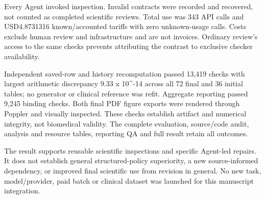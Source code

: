 \documentclass[11pt,letterpaper]{article}
\begin{document}
\endgroup

Every Agent invoked inspection. Invalid contracts were recorded and recovered, not counted as completed scientific reviews. Total use was 343 API calls and USD4.8731316 known/\allowbreak{}accounted tariffs with zero unknown-usage calls. Costs exclude human review and infrastructure and are not invoices. Ordinary review's access to the same checks prevents attributing the contrast to exclusive checker availability.


Independent saved-row and history recomputation passed 13,419 checks with largest arithmetic discrepancy 9.33 x 10\textasciicircum{}-14 across all 72 final and 36 initial tables; no generator or clinical reference was refit. Aggregate reporting passed 9,245 binding checks. Both final PDF figure exports were rendered through Poppler and visually inspected. These checks establish artifact and numerical integrity, not biomedical validity. The complete evaluation, source/\allowbreak{}code audit, analysis and resource tables, reporting QA and full result retain all outcomes.


The result supports reusable scientific inspections and specific Agent-led repairs. It does not establish general structured-policy superiority, a new source-informed dependency, or improved final scientific use from revision in general. No new task, model/\allowbreak{}provider, paid batch or clinical dataset was launched for this manuscript integration.
\end{document}
